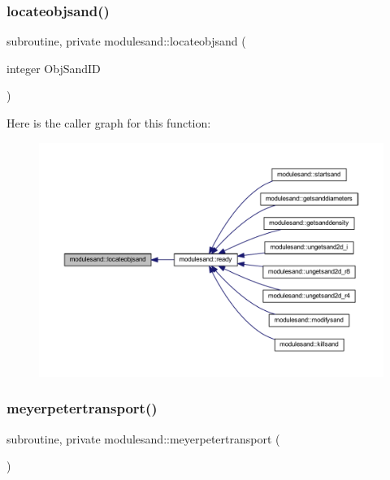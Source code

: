 \subsubsection{\texorpdfstring{locateobjsand()}{locateobjsand()}}
{\footnotesize\ttfamily subroutine, private modulesand\+::locateobjsand (\begin{DoxyParamCaption}\item[{integer}]{Obj\+Sand\+ID }\end{DoxyParamCaption})\hspace{0.3cm}{\ttfamily [private]}}

Here is the caller graph for this function\+:\nopagebreak
\begin{figure}[H]
\begin{center}
\leavevmode
\includegraphics[width=350pt]{namespacemodulesand_a1cc021f53fc9b3dfb942f3a272588046_icgraph}
\end{center}
\end{figure}
\mbox{\label{namespacemodulesand_a127d449cfb0928af3dd2e7b348aca9cc}} 
\subsubsection{\texorpdfstring{meyerpetertransport()}{meyerpetertransport()}}
{\footnotesize\ttfamily subroutine, private modulesand\+::meyerpetertransport (\begin{DoxyParamCaption}{ }\end{DoxyParamCaption})\hspace{0.3cm}{\ttfamily [private]}}

